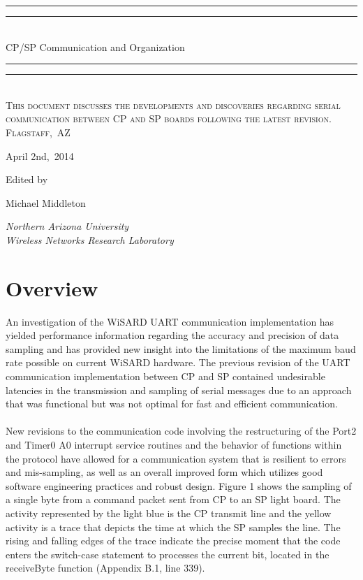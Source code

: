 \documentclass{article}
\newcommand{\lastUpdate}{April 2nd,\ 2014} 			%
\newcommand{\projectTitle}{CP/SP Communication and Organization}	%
\newcommand{\institution}{Northern Arizona University\\Wireless Networks Research Laboratory} 	%
\newcommand{\authorNames}{Michael Middleton} 	%
\newcommand{\location}{Flagstaff,\ AZ}					%
\newcommand{\projectDescription}{This document discusses the developments and discoveries regarding serial communication between CP and SP boards following the latest revision.}
\newcommand*{\titleGroup}
{\begingroup %
	\centering %
	\vspace*{\baselineskip} %
	\vspace*{10pt}

	\rule{\textwidth}{1.6pt}\vspace*{-\baselineskip}\vspace*{2pt} 	%
	\rule{\textwidth}{0.4pt}\\[\baselineskip] 				%

	{\LARGE \projectTitle}\\[0.2\baselineskip]	 			%

	\rule{\textwidth}{0.4pt}\vspace*{-\baselineskip}\vspace{3.2pt} 	%
	\rule{\textwidth}{1.6pt}\\[\baselineskip] 				%

	\scshape %
	\projectDescription \\[\baselineskip] 	%
	\location\par 				%
	\lastUpdate\par 			%

	\vspace*{2\baselineskip} %

	Edited by \\[\baselineskip]
	{\Large \authorNames\par} 	%
	{\itshape \institution\par} %

	\vfill %

\endgroup}
\begin{document}
\thispagestyle{empty}
\titleGroup




\newpage
\tableofcontents
\newpage


\section{Overview}
An investigation of the WiSARD UART communication implementation has yielded performance information regarding the accuracy and precision of data sampling and has provided new insight into the limitations of the maximum baud rate possible on current WiSARD hardware. The previous revision of the UART communication implementation between CP and SP contained undesirable latencies in the transmission and sampling of serial messages due to an approach that was functional but was not optimal for fast and efficient communication.
\\\\
New revisions to the communication code involving the restructuring of the Port2 and Timer0 A0 interrupt service routines and the behavior of functions within the protocol have allowed for a communication system that is resilient to errors and mis-sampling, as well as an overall improved form which utilizes good software engineering practices and robust design. Figure 1 shows the sampling of a single byte from a command packet sent from CP to an SP light board. The activity represented by the light blue is the CP transmit line and the yellow activity is a trace that depicts the time at which the SP samples the line. The rising and falling edges of the trace indicate the precise moment that the code enters the switch-case statement to processes the current bit, located in the receiveByte function (Appendix B.1,  line 339).  
\end{document}

